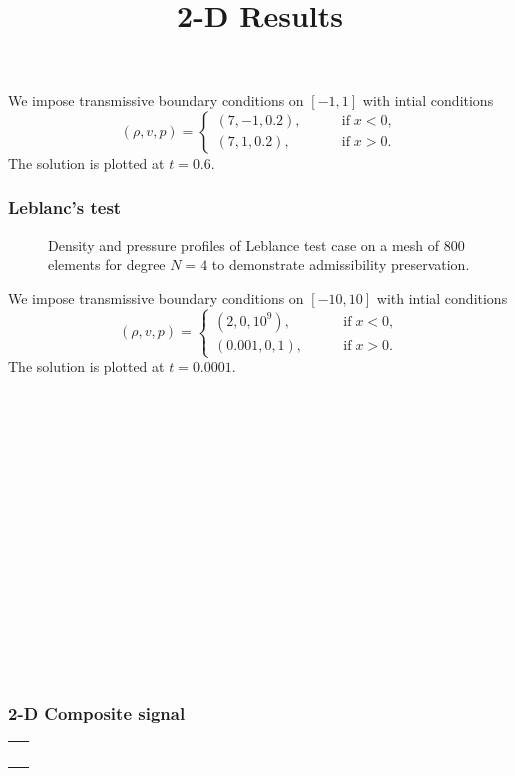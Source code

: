 \documentclass{beamer}
\newcommand{\tmop}[1]{\ensuremath{\operatorname{#1}}}
\begin{document}
{{\begin{frame}
  We impose transmissive boundary conditions on $[- 1, 1]$ with intial
  conditions
  \[ (\rho, v, p) = \left\{\begin{array}{lll}
       (7, - 1, 0.2), & \quad & \tmop{if} x < 0,\\
       (7, 1, 0.2), &  & \tmop{if} x > 0.
     \end{array}\right. \]
  The solution is plotted at $t = 0.6$.
\end{frame}}{\begin{frame}
  \frametitle{Leblanc's test}
  
  \begin{figure}[h]
    \caption{Density and pressure profiles of Leblance test case on a mesh of
    800 elements for degree $N = 4$ to demonstrate admissibility
    preservation.}
  \end{figure}
  
  We impose transmissive boundary conditions on $[- 10, 10]$ with intial
  conditions
  \[ (\rho, v, p) = \left\{\begin{array}{lll}
       (2, 0, 10^9), & \quad & \tmop{if} x < 0,\\
       (0.001, 0, 1), &  & \tmop{if} x > 0.
     \end{array}\right. \]
  The solution is plotted at $t = 0.0001$.
\end{frame}}{\begin{frame}
  \
  
  \
  
  \
  
  \
  
  \
  
  \begin{center}
    \ 
  \end{center}
  
  \
  
  \
  
  \title{2-D Results}
  
  \maketitle
  
  \ 
\end{frame}}{\begin{frame}
  \frametitle{2-D Composite signal {\cite{LeVeque1996}}}
  
  {\noindent}\begin{tabularx}{1.0\textwidth}{@{}X@{}}
    \
    

\end{tabularx}
\end{frame}}}
\end{document}
